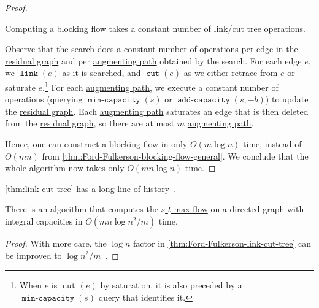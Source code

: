 \begin{proof}
	\begin{claim}
		Computing a \hyperref[def:blocking-flow]{blocking flow} takes a constant number of \hyperref[def:link-cut-tree]{link/cut tree} operations.
	\end{claim}
	\begin{explanation}
		Observe that the search does a constant number of operations per edge in the \hyperref[def:residual-graph]{residual graph} and per \hyperref[def:augmenting-path]{augmenting path} obtained by the search. For each edge \(e\), we \(\operatorname{\texttt{link}} (e)\) as it is searched, and \(\operatorname{\texttt{cut}} (e)\) as we either retrace from \(e\) or saturate \(e\).\footnote{When \(e\) is \(\operatorname{\texttt{cut}} (e)\) by saturation, it is also preceded by a \(\operatorname{\texttt{min-capacity}} (s)\) query that identifies it.} For each \hyperref[def:augmenting-path]{augmenting path}, we execute a constant number of operations (querying \(\operatorname{\texttt{min-capacity}} (s)\) or \(\operatorname{\texttt{add-capacity}} (s, -b)\)) to update the \hyperref[def:residual-graph]{residual graph}. Each \hyperref[def:augmenting-path]{augmenting path} saturates an edge that is then deleted from the \hyperref[def:residual-graph]{residual graph}, so there are at most \(m\) \hyperref[def:augmenting-path]{augmenting path}.
	\end{explanation}

	Hence, one can construct a \hyperref[def:blocking-flow]{blocking flow} in only \(O(m \log n)\) time, instead of \(O(mn)\) from \autoref{thm:Ford-Fulkerson-blocking-flow-general}. We conclude that the whole algorithm now takes only \(O(mn \log n)\) time.
\end{proof}

\begin{note}
	\autoref{thm:link-cut-tree} has a long line of history~\cite{shiloach1978n,galil1980eviog2v,sleator1981nm,sleator1981data,dominic1983data}.
\end{note}

\begin{corollary}\label{col:Ford-Fulkerson-link-cut-tree}
	There is an algorithm that computes the \hyperref[prb:s-t-max-flow]{\(s\)-\(t\) max-flow} on a directed graph with integral capacities in \(O(mn \log n^2 / m)\) time.
\end{corollary}
\begin{proof}
	With more care, the \(\log n\) factor in \autoref{thm:Ford-Fulkerson-link-cut-tree} can be improved to \(\log n^2 / m\)~\cite{goldberg1990finding}.
\end{proof}

